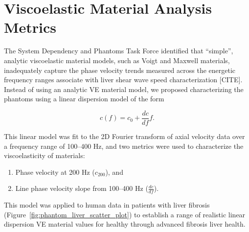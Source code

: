 \section{Viscoelastic Material Analysis Metrics}\label{sect:ve_analysis}

The System Dependency and Phantoms Task Force identified that ``simple'',
analytic viscoelastic material models, such as Voigt and Maxwell materials,
inadequately capture the phase velocity trends measured across the energetic
frequency ranges associate with liver shear wave speed characterization [CITE].
Instead of using an analytic VE material model, we proposed characterizing the
phantoms using a linear dispersion model of the form

\begin{equation}
c(f) = c_0 + \frac{dc}{df} f.
\end{equation}

This linear model was fit to the 2D Fourier transform of axial velocity data
over a frequency range of 100--400 Hz, and two metrics were used to
characterize the viscoelasticity of materials:

\begin{enumerate}
    \item Phase velocity at 200 Hz ($c_{200}$), and
    \item Line phase velocity slope from 100--400 Hz ($\frac{dc}{df}$).
\end{enumerate}

This model was applied to human data in patients with liver
fibrosis~\cite{Palmeri2011} (Figure~\ref{fig:phantom_liver_scatter_plot}) to
establish a range of realistic linear dispersion VE material values for healthy
through advanced fibrosis liver health.




